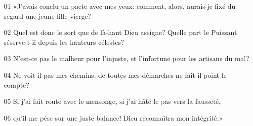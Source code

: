 01 «J’avais conclu un pacte avec mes yeux: comment, alors, aurais-je fixé du regard une jeune fille vierge?

02 Quel est donc le sort que de là-haut Dieu assigne? Quelle part le Puissant réserve-t-il depuis les hauteurs célestes?

03 N’est-ce pas le malheur pour l’injuste, et l’infortune pour les artisans du mal?

04 Ne voit-il pas mes chemins, de toutes mes démarches ne fait-il point le compte?

05 Si j’ai fait route avec le mensonge, si j’ai hâté le pas vers la fausseté,

06 qu’il me pèse sur une juste balance! Dieu reconnaîtra mon intégrité.»
